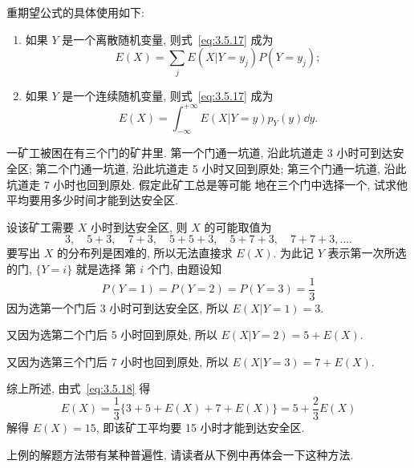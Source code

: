 	重期望公式的具体使用如下: 
	\begin{enumerate}
		\item 如果 $Y$ 是一个离散随机变量, 则式~\eqref{eq:3.5.17} 成为
			\begin{equation}
				E(X)=\sum_{j} E\left(X | Y=y_{j}\right) P\left(Y=y_{j}\right);\label{eq:3.5.18}
			\end{equation}
		\item 如果 $Y$ 是一个连续随机变量, 则式~\eqref{eq:3.5.17} 成为
			\begin{equation}
				E(X)=\int_{-\infty}^{+\infty} E(X | Y=y) p_{Y}(y) \dd y.\label{eq:3.5.19}
			\end{equation}
	\end{enumerate}
	\begin{example}\label{exam:3.5.7}
		一矿工被困在有三个门的矿井里. 第一个门通一坑道, 沿此坑道走 3 小时可到达安全区; 第二个门通一坑道, 
		沿此坑道走 5 小时又回到原处; 第三个门通一坑道, 沿此坑道走 7 小时也回到原处. 假定此矿工总是等可能
		地在三个门中选择一个, 试求他平均要用多少时间才能到达安全区.
	\end{example}
	\begin{solution}
		设该矿工需要 $X$ 小时到达安全区, 则 $X$ 的可能取值为
		\[
			3,\quad 5+3,\quad 7+3,\quad 5+5+3,\quad 5+7+3,\quad 7+7+3,\ldots.\]
		要写出 $X$ 的分布列是困难的, 所以无法直接求 $E(X)$. 为此记 $Y$ 表示第一次所选的门, $\{Y=i\}$ 就是选择
		第 $i$ 个门, 由题设知
		\[
			P(Y=1)=P(Y=2)=P(Y=3)=\frac{1}{3}\]
		因为选第一个门后 3 小时可到达安全区, 所以 $E(X|Y=1)=3$.

		又因为选第二个门后 5 小时回到原处, 所以 $E(X|Y=2)=5+E(X)$.

		又因为选第三个门后 7 小时也回到原处, 所以 $E(X|Y=3)=7+E(X)$.

		综上所述, 由式~\eqref{eq:3.5.18} 得
		\[
			E(X)=\frac{1}{3}\{3+5+E(X)+7+E(X)\}=5+\frac{2}{3} E(X)\]
			解得 $E(X)=15$, 即该矿工平均要 15 小时才能到达安全区.
	\end{solution}
	上例的解题方法带有某种普遍性, 请读者从下例中再体会一下这种方法.

